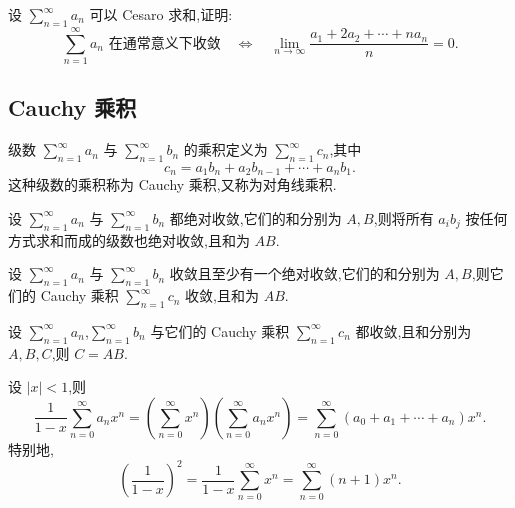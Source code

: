 \documentclass[../../数学分析培优讲义.tex]{subfiles}
\begin{document}
\begin{example}[\markstar]
设 $\displaystyle\sum\limits_{n=1}^{\infty}a_n$ 可以 Cesaro 求和,证明:
\[
    \sum\limits_{n=1}^{\infty}a_n\text{ 在通常意义下收敛}
    \quad\Longleftrightarrow\quad
    \lim\limits_{n\to\infty}\dfrac{a_1+2a_2+\cdots+na_n}{n}=0.
\]
\end{example}
\exampleblank



\subsection{Cauchy 乘积}

\begin{definition}
级数 $\displaystyle\sum\limits_{n=1}^{\infty}a_n$ 与 $\displaystyle\sum\limits_{n=1}^{\infty}b_n$ 的乘积定义为 $\displaystyle\sum\limits_{n=1}^{\infty}c_n$,其中
\[
    c_n=a_1b_n+a_2b_{n-1}+\cdots+a_nb_1.
\]
这种级数的乘积称为 Cauchy 乘积,又称为对角线乘积.
\end{definition}

\begin{theorem}
设 $\displaystyle\sum\limits_{n=1}^{\infty}a_n$ 与 $\displaystyle\sum\limits_{n=1}^{\infty}b_n$ 都绝对收敛,它们的和分别为 $A,B$,则将所有 $a_ib_j$ 按任何方式求和而成的级数也绝对收敛,且和为 $AB$.
\end{theorem}

\begin{theorem}
设 $\displaystyle\sum\limits_{n=1}^{\infty}a_n$ 与 $\displaystyle\sum\limits_{n=1}^{\infty}b_n$ 收敛且至少有一个绝对收敛,它们的和分别为 $A,B$,则它们的 Cauchy 乘积 $\displaystyle\sum\limits_{n=1}^{\infty}c_n$ 收敛,且和为 $AB$.
\end{theorem}

\begin{theorem}
设 $\displaystyle\sum\limits_{n=1}^{\infty}a_n$,$\displaystyle\sum\limits_{n=1}^{\infty}b_n$ 与它们的 Cauchy 乘积 $\displaystyle\sum\limits_{n=1}^{\infty}c_n$ 都收敛,且和分别为 $A,B,C$,则 $C=AB$.
\end{theorem}

\begin{example}[\markstar]
设 $|x|<1$,则
\[
    \dfrac{1}{1-x}\sum\limits_{n=0}^{\infty}a_nx^n
    =\left(\sum\limits_{n=0}^{\infty}x^n\right)
    \left(\sum\limits_{n=0}^{\infty}a_nx^n\right)
    =\sum\limits_{n=0}^{\infty}(a_0+a_1+\cdots+a_n)x^n.
\]
特别地,
\[
    \left(\dfrac{1}{1-x}\right)^2
    =\dfrac{1}{1-x}\sum\limits_{n=0}^{\infty}x^n
    =\sum\limits_{n=0}^{\infty}(n+1)x^n.
\]
\end{example}
\exampleblank
\end{document}
